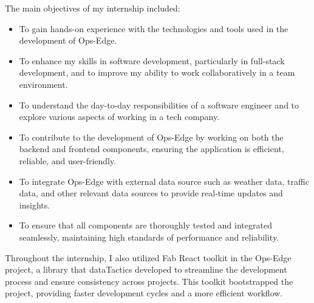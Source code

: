 The main objectives of my internship included:

\begin{itemize}
    \item To gain hands-on experience with the technologies and tools used in the development of Ops-Edge.
    \item To enhance my skills in software development, particularly in full-stack development, and to improve my ability to work collaboratively in a team environment.
    \item To understand the day-to-day responsibilities of a software engineer and to explore various aspects of working in a tech company.
    \item To contribute to the development of Ops-Edge by working on both the backend and frontend components, ensuring the application is efficient, reliable, and user-friendly.
    \item To integrate Ops-Edge with external data source such as weather data, traffic data, and other relevant data sources to provide real-time updates and insights.
    \item To ensure that all components are thoroughly tested and integrated seamlessly, maintaining high standards of performance and reliability.
\end{itemize}

Throughout the internship, I also utilized Fab React toolkit in the Ops-Edge project, a library that dataTactics developed to streamline the development process and ensure consistency across projects. This toolkit bootstrapped the project, providing faster development cycles and a more efficient workflow.